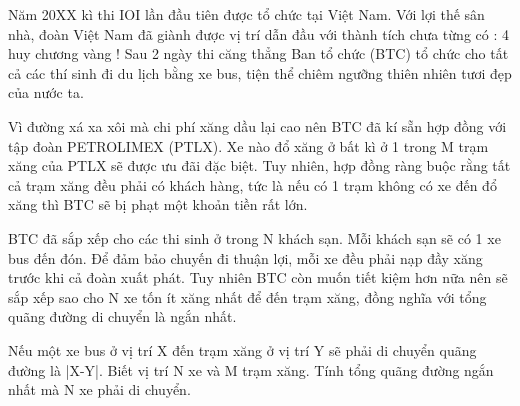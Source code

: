 Năm 20XX kì thi IOI lần đầu tiên được tổ chức tại Việt Nam. Với lợi thế sân nhà, đoàn Việt Nam đã giành được vị trí dẫn đầu với thành tích chưa từng có : 4 huy chương vàng ! Sau 2 ngày thi căng thẳng Ban tổ chức (BTC) tổ chức cho tất cả các thí sinh đi du lịch bằng xe bus, tiện thể chiêm ngưỡng thiên nhiên tươi đẹp của nước ta.  

   Vì đường xá xa xôi mà chi phí xăng dầu lại cao nên BTC đã kí sẵn hợp đồng với tập đoàn PETROLIMEX (PTLX). Xe nào đổ xăng ở bất kì ở 1 trong M trạm xăng của PTLX sẽ được ưu đãi đặc biệt. Tuy nhiên, hợp đồng ràng buộc rằng tất cả trạm xăng đều phải có khách hàng, tức là nếu có 1 trạm không có xe đến đổ xăng thì BTC sẽ bị phạt một khoản tiền rất lớn.  

   BTC đã sắp xếp cho các thi sinh ở trong N khách sạn. Mỗi khách sạn sẽ có 1 xe bus đến đón. Để đảm bảo chuyến đi thuận lợi, mỗi xe đều phải nạp đầy xăng trước khi cả đoàn xuất phát. Tuy nhiên BTC còn muốn tiết kiệm hơn nữa nên sẽ sắp xếp sao cho N xe tốn ít xăng nhất để đến trạm xăng, đồng nghĩa với tổng quãng đường di chuyển là ngắn nhất.  

   Nếu một xe bus ở vị trí X đến trạm xăng ở vị trí Y sẽ phải di chuyển quãng đường là |X-Y|. Biết vị trí N xe và M trạm xăng. Tính tổng quãng đường ngắn nhất mà N xe phải di chuyển.